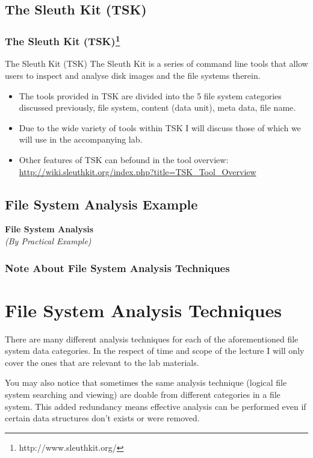 \documentclass{beamer}
\begin{document}
\begin{frame}
	\subsection*{The Sleuth Kit (TSK)}
	\frametitle{The Sleuth Kit (TSK)\footnote{http://www.sleuthkit.org/}}
	\begin{block}{The Sleuth Kit (TSK)}
	The Sleuth Kit is a series of command line tools that allow users to inspect and analyse disk images and the file systems therein.
	\end{block}
	\begin{itemize}
		\item The tools provided in TSK are divided into the 5 file system categories discussed previously, file system, content (data unit), meta data, file name.
		\item Due to the wide variety of tools within TSK I will discuss those of which we will use in the accompanying lab.
		\item Other features of TSK can befound in the tool overview: \url{http://wiki.sleuthkit.org/index.php?title=TSK_Tool_Overview}
	\end{itemize}
\end{frame}

\begin{frame}%
	\section{File System Analysis Example}
	\begin{center}
		\Huge\textbf{File System Analysis}\\
		\large\textit{(By Practical Example)}
	\end{center}
\end{frame}

\begin{frame}
	\frametitle{Note About File System Analysis Techniques}
	\section*{File System Analysis Techniques}
	There are many different analysis techniques for each of the aforementioned file system data categories. In the respect of time and scope of the lecture I will only cover the ones that are relevant to the lab materials.
	
	\vspace{\baselineskip}
	
	You may also notice that sometimes the same analysis technique (logical file system searching and viewing) are doable from different categories in a file system. This added redundancy means effective analysis can be performed even if certain data structures don't exists or were removed.
\end{frame}
\end{document}
